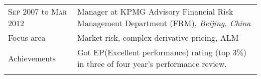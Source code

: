 \documentclass[a4paper,10pt]{article}
\begin{document}
\begin{tabular}{R{2.5cm}|L{10.5cm}}
 \textsc{Sep} 2007 to  \textsc{Mar} 2012 & \large{Manager at \textsc{KPMG} Advisory Financial Risk Management Department (FRM)},  \emph{Beijing, China}
 \\ Focus area  & Market risk, complex derivative pricing, ALM   \\ 
Achievements & Got EP(Excellent performance) rating (top 3\%) in three of four year's performance review. \\
 
 
  \\
\end{tabular}
\end{document}
